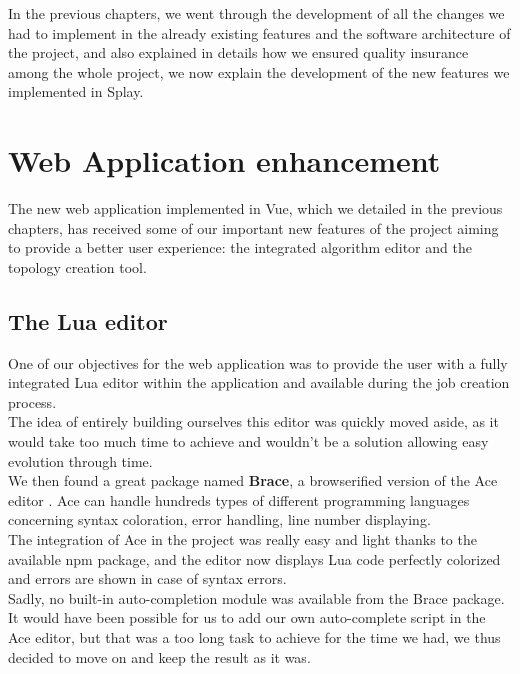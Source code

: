 \documentclass{eplmastersthesis}
\begin{document}
      In the previous chapters, we went through the development of all
      the changes we had to implement in the already existing features
      and the software architecture of the project, and also explained
      in details how we ensured quality insurance among the whole project,
      we now explain the development of the new features we implemented in
      Splay.

      \section{Web Application enhancement}

        The new web application implemented in Vue, which we detailed in
        the previous chapters, has received some of our important new features
        of the project aiming to provide a better user experience: the
        integrated algorithm editor and the topology creation tool.

        \subsection{The Lua editor}

          One of our objectives for the web application was to provide the user
          with a fully integrated Lua editor within the application and
          available during the job creation process.\\
          The idea of entirely building ourselves this editor was quickly
          moved aside, as it would take too much time to achieve and wouldn't
          be a solution allowing easy evolution through time.\\
          We then found a great package named \textbf{Brace}, a browserified
          version of the Ace editor \cite{Ace}. Ace can handle hundreds types
          of different programming languages concerning syntax coloration,
          error handling, line number displaying.\\

          The integration of Ace in the project was really easy and light thanks
          to the available npm package, and the editor now displays Lua code
          perfectly colorized and errors are shown in case of syntax errors.\\

          Sadly, no built-in auto-completion module was available from the
          Brace package. It would have been possible for us to add our own
          auto-complete script in the Ace editor, but that was a too long
          task to achieve for the time we had, we thus decided to move on and
          keep the result as it was.
\end{document}

